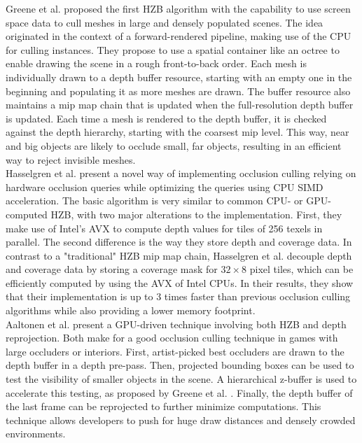\documentclass[conference]{IEEEtran}
\begin{document}
\noindent
Greene et al. \cite{b1} proposed the first \ac{HZB} algorithm with the capability to use 
screen space data to cull meshes in large and densely populated scenes. The idea originated 
in the context of a forward-rendered pipeline, making use of the \ac{CPU} for culling instances. 
They propose to use a spatial container like an octree to enable drawing the scene in a rough 
front-to-back order. Each mesh is individually drawn to a depth buffer resource, starting with 
an empty one in the beginning and populating it as more meshes are drawn. The buffer resource 
also maintains a mip map chain that is updated when the full-resolution depth buffer is updated. 
Each time a mesh is rendered to the depth buffer, it is checked against the depth hierarchy, 
starting with the coarsest mip level. This way, near and big objects are likely to occlude small, 
far objects, resulting in an efficient way to reject invisible meshes. \\

\noindent
Hasselgren et al. \cite{b3} present a novel way of implementing occlusion culling relying on hardware 
occlusion queries while optimizing the queries using \ac{CPU} \ac{SIMD} acceleration. The basic algorithm 
is very similar to common \ac{CPU}- or \ac{GPU}-computed \ac{HZB}, with two major alterations to the implementation. 
First, they make use of Intel's \ac{AVX} to compute depth values for tiles of 256 texels in parallel. 
The second difference is the way they store depth and coverage data. In contrast to a "traditional" 
\ac{HZB} mip map chain, Hasselgren et al. decouple depth and coverage data by storing a coverage mask for 
$32 \times 8$ pixel tiles, which can be efficiently computed by using the \ac{AVX} of Intel \ac{CPU}s. In 
their results, they show that their implementation is up to 3 times faster than previous occlusion 
culling algorithms while also providing a lower memory footprint. \\

\noindent
Aaltonen et al. \cite{b4} present a \ac{GPU}-driven technique involving both \ac{HZB} and depth reprojection. 
Both make for a good occlusion culling technique in games with large occluders or interiors. First, 
artist-picked best occluders are drawn to the depth buffer in a depth pre-pass. Then, projected bounding
boxes can be used to test the visibility of smaller objects in the scene. A hierarchical z-buffer is 
used to accelerate this testing, as proposed by Greene et al. \cite{b1}. Finally, the depth buffer of 
the last frame can be reprojected to further minimize computations. This technique allows developers 
to push for huge draw distances and densely crowded environments.
\end{document}
